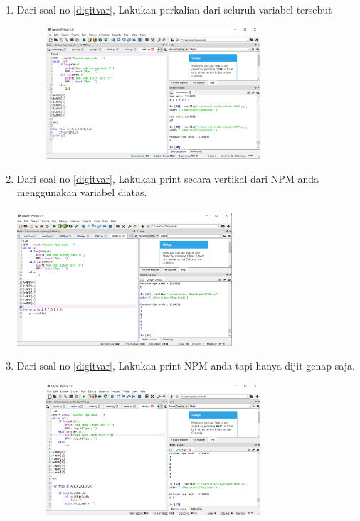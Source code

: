 \begin{enumerate}
\item 
Dari soal no \ref{digitvar}, Lakukan perkalian dari seluruh variabel tersebut
\begin{figure}[h]
\centerline{\includegraphics[width=8cm]{figures/npm7.PNG}}
\end{figure}


\item
Dari soal no \ref{digitvar}, Lakukan print secara vertikal dari NPM anda menggunakan variabel diatas. 
\paragraph{}
\centerline{\includegraphics[width=8cm]{figures/npm8.PNG}}


\item
Dari soal no \ref{digitvar}, Lakukan print NPM anda tapi hanya dijit genap saja. 
\begin{figure}[h]
\centerline{\includegraphics[width=8cm]{figures/npm9.PNG}}
\end{figure}



\end{enumerate}
